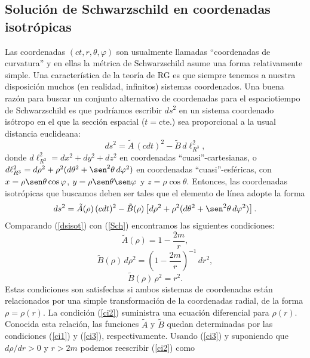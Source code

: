 \subsection{Solución de Schwarzschild en coordenadas isotrópicas}

Las coordenadas $(ct,r,\theta,\varphi)$ son usualmente llamadas ``coordenadas de curvatura'' y en ellas la métrica de Schwarzschild asume una forma relativamente simple.
Una característica de la teoría de RG es que siempre tenemos a
nuestra disposición muchos (en realidad, infinitos) sistemas coordenados. Una
buena razón para buscar un conjunto alternativo de coordenadas para el espaciotiempo de Schwarzschild es que podríamos escribir $ds^2$ en un sistema coordenado isótropo en el que la sección espacial ($t=$cte.) sea proporcional a la usual distancia euclideana:
\begin{equation}
ds^2=\tilde{A}\,(cdt)^2-\tilde{B}\,d\ell^2_{R^3} ,
\end{equation}
donde $d\ell^2_{R^3}=dx^2+dy^2+dz^2$ en coordenadas ``cuasi''-cartesianas, o
$d\ell^2_{R^3}=d\rho^2+\rho^2(d\theta^2+\sen^2\theta\,d\varphi^2)$ en coordenadas
``cuasi''-esféricas, con $x=\rho\sen\theta\cos\varphi$, $y=\rho\sen\theta\sen\varphi$ y $z=\rho\cos\theta$.
Entonces, las coordenadas isotrópicas que buscamos deben ser tales que el elemento de línea adopte la forma
\begin{equation}
ds^2=\tilde{A}(\rho)\,(cdt)^2-\tilde{B}(\rho)\left[d\rho^2+\rho^2(d\theta^2+\sen^2\theta\,d\varphi^2)\right] .\label{dsisot}
\end{equation}
Comparando (\ref{dsisot}) con (\ref{Sch}) encontramos las siguientes condiciones:
\begin{equation}
 \tilde{A}(\rho)=1-\frac{2m}{r}, \label{ci1}
\end{equation}
\begin{equation}
 \tilde{B}(\rho)\,d\rho^2=\left(1-\frac{2m}{r}\right)^{-1}\,dr^2, \label{ci2}
\end{equation}
\begin{equation}
 \tilde{B}(\rho)\,\rho^2=r^2. \label{ci3}
\end{equation}
Estas condiciones son satisfechas si ambos sistemas de coordenadas están relacionados por una simple transformación de la coordenadas radial, de la forma $\rho=\rho(r)$. La condición (\ref{ci2}) suministra una ecuación diferencial para $\rho(r)$. Conocida esta relación, las funciones $\tilde{A}$ y $\tilde{B}$ quedan determinadas por las condiciones (\ref{ci1}) y (\ref{ci3}), respectivamente. Usando (\ref{ci3}) y suponiendo que $d\rho/dr>0$ y $r>2m$ podemos reescribir (\ref{ci2}) como
